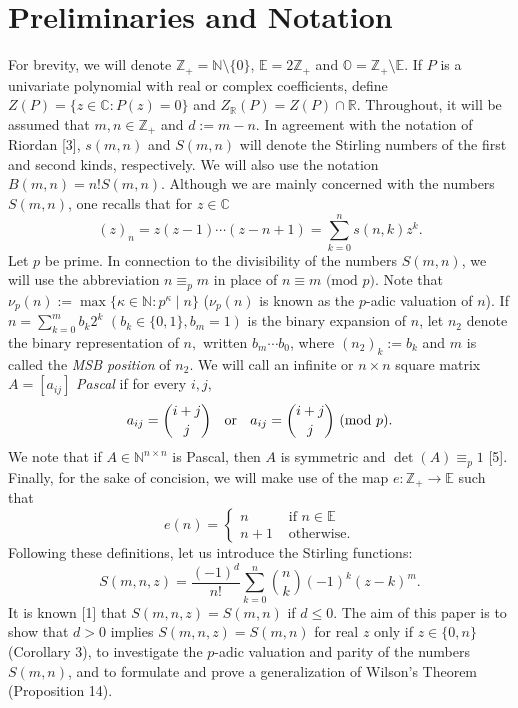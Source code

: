 \documentclass[]{amsart}
\begin{document}
\section*{Preliminaries and Notation}
For brevity, we will denote $\mathbb{Z}_{+} = \mathbb{N} \setminus \{0\}$, $\mathbb{E} = 2\mathbb{Z}_{+}$ and $\mathbb{O} = \mathbb{Z}_{+} \setminus \mathbb{E}$.  If $P$ is a univariate polynomial with real or complex coefficients, define $Z(P) = \{z \in \mathbb{C} : P(z) = 0\}$ and $Z_{\mathbb{R}}(P) = Z(P) \cap \mathbb{R}$.  Throughout, it will be assumed that $m,n \in \mathbb{Z}_{+}$ and $d := m-n$.  In agreement with the notation of Riordan [3], $s(m,n)$ and $S(m,n)$ will denote the Stirling numbers of the first and second kinds, respectively.  We will also use the notation $B(m,n) = n!S(m,n)$. Although we are mainly concerned with the numbers $S(m,n)$, one recalls that for $z \in \mathbb{C}$
\[ (z)_{n} = z(z-1)\cdots(z-n+1) = \sum_{k=0}^{n}s(n,k)z^{k}. \]
Let $p$ be prime.  In connection to the divisibility of the numbers $S(m,n)$, we will use the abbreviation $n \equiv_{p} m$ in place of $n \equiv m \mbox{ (mod $p$)}$.  Note that $\nu_{p}(n) := \max\{\kappa \in \mathbb{N} : p^{\kappa} \mid n\}$
($\nu_{p}(n)$ is known as the $p$-adic valuation of $n$).  If $n = \sum_{k=0}^{m} b_{k}2^{k}$ $(b_{k} \in \{0,1\}, b_{m} = 1)$ is the binary expansion of $n$, let $n_{2}$ denote the binary representation of $n,$ written $b_{m}\cdots b_{0}$, where $(n_{2})_{k} := b_{k}$ and $m$ is called the \textit{MSB position} of $n_{2}$.  We will call an infinite or $n \times n$ square matrix $A = [a_{ij}]$ \textit{Pascal} if for every $i,j$,
\[ a_{ij} = {i+j \choose j} \mbox{ \hspace{1mm} or \hspace{1mm} } a_{ij} = {i+j \choose j} \mbox{ (mod $p$)}. \]
We note that if $A \in \mathbb{N}^{n \times n}$ is Pascal, then $A$ is symmetric and $\det(A) \equiv_{p} 1$ [5].  Finally, for the sake of concision, we will make use of the map $e : \mathbb{Z}_{+} \rightarrow \mathbb{E}$ such that
$$
e(n) = \left\{ \begin{array}{rl}
n &\mbox{ if $n \in \mathbb{E}$} \\
n+1 &\mbox{ otherwise}.
\end{array} \right.
$$ 
Following these definitions, let us introduce the Stirling functions:
\[ S(m,n,z) = \frac{(-1)^{d}}{n!}\sum_{k=0}^{n}{n \choose k}(-1)^{k}(z-k)^{m}. \]
It is known [1] that $S(m,n,z) = S(m,n)$ if $d \leq 0$.  The aim of this paper is to show that $d > 0$ implies $S(m,n,z) = S(m,n)$ for real $z$ only if $z \in \{0,n\}$ (Corollary 3), to investigate the $p$-adic valuation and parity of the numbers $S(m,n)$, and to formulate and prove a generalization of Wilson's Theorem (Proposition 14).
\end{document}
